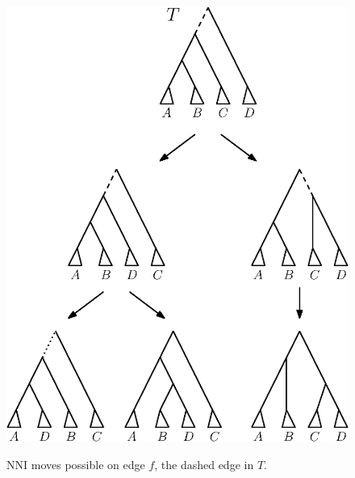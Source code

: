 \documentclass{amsart}
\newcommand{\nni}{\mathrm{NNI}}
\begin{document}
\begin{enumerate}
    \begin{figure}[!hbt]
    \centering
        \begin{minipage}{.45\textwidth}
            \centering
            \includegraphics[width=0.9\linewidth]{thm_fp_nni2a.eps}
            \vspace{12pt}
            \label{fig:thm_fp_nni2a}
            \caption{$\nni$ moves possible on edge $f$, the dashed edge in $T$.}
        \end{minipage}
        \begin{minipage}{0.45\textwidth}
            \centering

\end{minipage}
\end{figure}
\end{enumerate}
\end{document}
